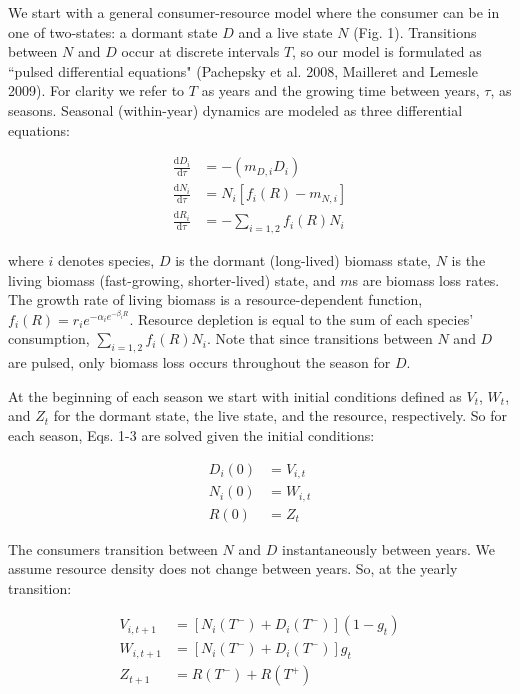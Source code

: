 \documentclass[12pt,]{article}
\begin{document}
We start with a general consumer-resource model where the consumer can
be in one of two-states: a dormant state $D$ and a live state $N$ (Fig.
1). Transitions between $N$ and $D$ occur at discrete intervals $T$, so
our model is formulated as ``pulsed differential equations" (Pachepsky
et al. 2008, Mailleret and Lemesle 2009). For clarity we refer to $T$ as
years and the growing time between years, $\tau$, as seasons. Seasonal
(within-year) dynamics are modeled as three differential equations:

\begin{align}
\frac{\text{d}D_{i}}{\text{d}\tau} &= -(m_{D,i}D_{i})\\
\frac{\text{d}N_{i}}{\text{d}\tau} &= N_{i}[f_{i}(R) - m_{N,i}]\\
\frac{\text{d}R_{i}}{\text{d}\tau} &= - \sum\limits_{i=1,2}f_{i}(R)N_{i}
\end{align}

where $i$ denotes species, $D$ is the dormant (long-lived) biomass
state, $N$ is the living biomass (fast-growing, shorter-lived) state,
and $m$s are biomass loss rates. The growth rate of living biomass is a
resource-dependent function,
$f_{i}(R) = r_{i}e^{-\alpha_{i}e^{-\beta_{i}R}}$. Resource depletion is
equal to the sum of each species' consumption,
$\sum_{i=1,2}f_{i}(R)N_{i}$. Note that since transitions between $N$ and
$D$ are pulsed, only biomass loss occurs throughout the season for $D$.

At the beginning of each season we start with initial conditions defined
as $V_{t}$, $W_{t}$, and $Z_{t}$ for the dormant state, the live state,
and the resource, respectively. So for each season, Eqs. 1-3 are solved
given the initial conditions:

\begin{align}
  D_{i}(0) &= V_{i,t} \\
  N_{i}(0) &= W_{i,t} \\
  R(0) &= Z_{t}
\end{align}

The consumers transition between $N$ and $D$ instantaneously between
years. We assume resource density does not change between years. So, at
the yearly transition:

\begin{align}
  V_{i,t+1} &= [N_{i}(T^-)+D_{i}(T^-)](1-g_{t}) \\
  W_{i,t+1} &= [N_{i}(T^-)+D_{i}(T^-)]g_{t} \\
  Z_{t+1} &= R(T^-) + R(T^+)
\end{align}
\end{document}
